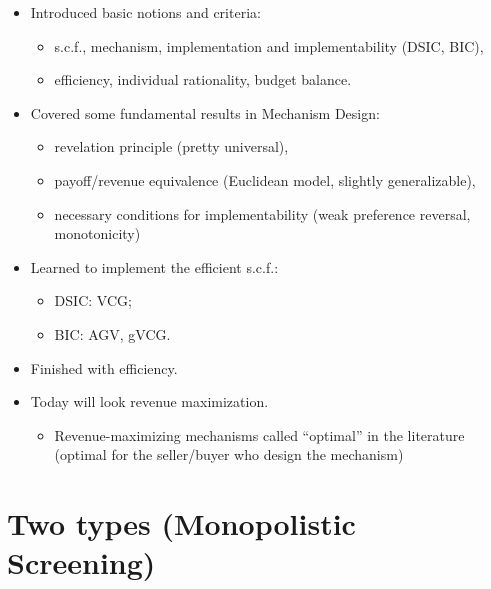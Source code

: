 \documentclass[english,handout]{beamer}		%
\def\lyxframeend{} %
\begin{document}
\begin{itemize}
	\item Introduced basic notions and criteria:
	\begin{itemize}
		\item s.c.f., mechanism, implementation and implementability (DSIC, BIC),
		\item efficiency, individual rationality, budget balance.
	\end{itemize}
	\pause
	\item Covered some fundamental results in Mechanism Design:
	\begin{itemize}
		\item revelation principle (pretty universal),
		\item payoff/revenue equivalence (Euclidean model, slightly generalizable),
		\item necessary conditions for implementability (weak preference reversal, monotonicity)
	\end{itemize}
	\pause
	\item Learned to implement the efficient s.c.f.:
	\begin{itemize}
		\item DSIC: VCG;
		\item BIC: AGV, gVCG.
	\end{itemize}
\end{itemize}
\lyxframeend


\begin{itemize}
	\item Finished with efficiency.
	\item Today will look revenue maximization.
	\begin{itemize}
		\item Revenue-maximizing mechanisms called ``optimal'' in the literature (optimal for the seller/buyer who design the mechanism)
	\end{itemize}
\end{itemize}
\lyxframeend


\section{Two types (Monopolistic Screening)}
\end{document}
